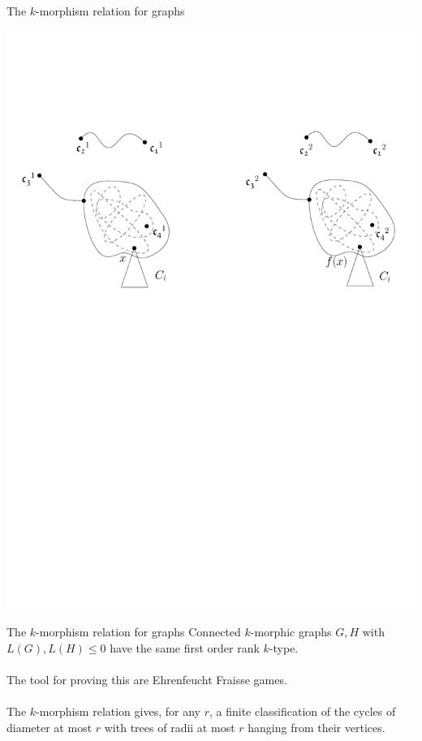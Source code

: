 \documentclass[11pt]{beamer}
\begin{document}
	\begin{frame}{The $k$-morphism relation for graphs}
	\begin{center}
	\vspace{1.6em}
	\includegraphics[width=\linewidth]{kmorphiccenter3.pdf}
	\end{center}
	\end{frame}

	\begin{frame}{The $k$-morphism relation for graphs}
		Connected $k$-morphic graphs $G,H$ with $L(G),L(H)\leq 0$ have the same
		first order rank $k$-type.	\\~\\
		
		The tool for proving this are Ehrenfeucht Fraisse games.
		\\~\\
		
		The $k$-morphism relation gives, for any $r$, a finite classification of the cycles of diameter
		at most $r$ with trees of radii at most $r$ hanging from their vertices. 
		
	\end{frame}


	
\end{document}
